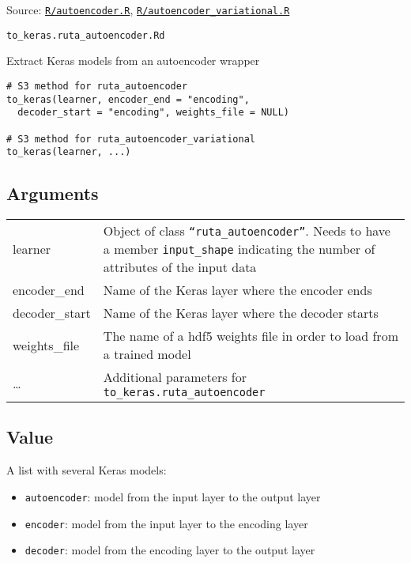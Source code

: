 Source:
\href{https://github.com/fdavidcl/ruta/blob/master/R/autoencoder.R}{\texttt{R/autoencoder.R}},
\href{https://github.com/fdavidcl/ruta/blob/master/R/autoencoder_variational.R}{\texttt{R/autoencoder\_variational.R}}

\texttt{to\_keras.ruta\_autoencoder.Rd}

Extract Keras models from an autoencoder wrapper

\begin{verbatim}
# S3 method for ruta_autoencoder
to_keras(learner, encoder_end = "encoding",
  decoder_start = "encoding", weights_file = NULL)

# S3 method for ruta_autoencoder_variational
to_keras(learner, ...)
\end{verbatim}

\hypertarget{arguments}{\subsection{\texorpdfstring{\protect\hyperlink{arguments}{}Arguments}{Arguments}}\label{arguments}}

\begin{longtable}[c]{@{}>{\small}p{3cm}>{\raggedright}p{12.5cm}@{}}
\toprule
learner & Object of class \texttt{``ruta\_autoencoder''}. Needs to have a
member \texttt{input\_shape} indicating the number of attributes of the
input data\tabularnewline
encoder\_end & Name of the Keras layer where the encoder
ends\tabularnewline
decoder\_start & Name of the Keras layer where the decoder
starts\tabularnewline
weights\_file & The name of a hdf5 weights file in order to load from a
trained model\tabularnewline
\ldots{} & Additional parameters for
\texttt{to\_keras.ruta\_autoencoder}\tabularnewline
\bottomrule
\end{longtable}

\hypertarget{value}{\subsection{\texorpdfstring{\protect\hyperlink{value}{}Value}{Value}}\label{value}}

A list with several Keras models:

\begin{itemize}
\item
  \texttt{autoencoder}: model from the input layer to the output layer
\item
  \texttt{encoder}: model from the input layer to the encoding layer
\item
  \texttt{decoder}: model from the encoding layer to the output layer
\end{itemize}

